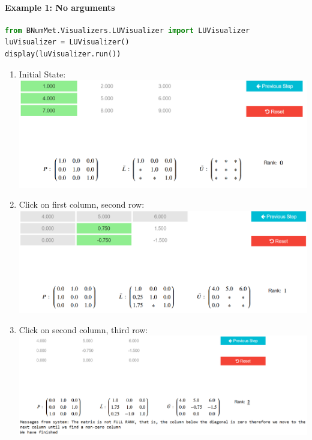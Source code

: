 \paragraph{Example 1: No arguments}{
\begin{lstlisting}[language=Python]
from BNumMet.Visualizers.LUVisualizer import LUVisualizer
luVisualizer = LUVisualizer()
display(luVisualizer.run())
\end{lstlisting}

\begin{enumerate}
  \item Initial State:\\  
    \includegraphics[scale=0.45]{Include/Images/Thesis/Documentation/Visualizers/LUVisualizer/Example 1/Example 1 - 00 - Initial State.png}
  \item Click on first column, second row:\\
    \includegraphics[scale=0.45]{Include/Images/Thesis/Documentation/Visualizers/LUVisualizer/Example 1/Example 1 - 01 - Click on 2 row.png}
  \item Click on second column, third row:\\
    \includegraphics[scale=0.4]{Include/Images/Thesis/Documentation/Visualizers/LUVisualizer/Example 1/Example 1 - 02 - Click on 3 row.png}

\end{enumerate}}
